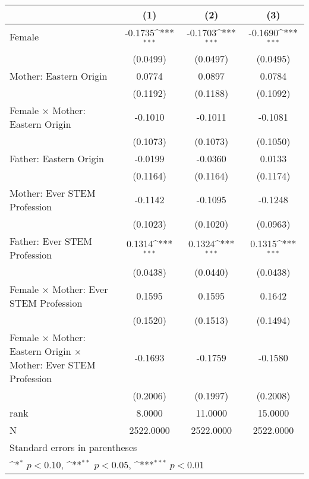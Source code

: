{
\def\sym#1{\ifmmode^{#1}\else\(^{#1}\)\fi}
\begin{tabular}{l*{3}{c}}
\toprule
                    &\multicolumn{1}{c}{(1)}         &\multicolumn{1}{c}{(2)}         &\multicolumn{1}{c}{(3)}         \\
\midrule
Female              &     -0.1735\sym{***}&     -0.1703\sym{***}&     -0.1690\sym{***}\\
                    &    (0.0499)         &    (0.0497)         &    (0.0495)         \\
\addlinespace
Mother: Eastern Origin&      0.0774         &      0.0897         &      0.0784         \\
                    &    (0.1192)         &    (0.1188)         &    (0.1092)         \\
\addlinespace
Female $\times$ Mother: Eastern Origin&     -0.1010         &     -0.1011         &     -0.1081         \\
                    &    (0.1073)         &    (0.1073)         &    (0.1050)         \\
\addlinespace
Father: Eastern Origin&     -0.0199         &     -0.0360         &      0.0133         \\
                    &    (0.1164)         &    (0.1164)         &    (0.1174)         \\
\addlinespace
Mother: Ever STEM Profession&     -0.1142         &     -0.1095         &     -0.1248         \\
                    &    (0.1023)         &    (0.1020)         &    (0.0963)         \\
\addlinespace
Father: Ever STEM Profession&      0.1314\sym{***}&      0.1324\sym{***}&      0.1315\sym{***}\\
                    &    (0.0438)         &    (0.0440)         &    (0.0438)         \\
\addlinespace
Female $\times$ Mother: Ever STEM Profession&      0.1595         &      0.1595         &      0.1642         \\
                    &    (0.1520)         &    (0.1513)         &    (0.1494)         \\
\addlinespace
Female $\times$ Mother: Eastern Origin $\times$ Mother: Ever STEM Profession&     -0.1693         &     -0.1759         &     -0.1580         \\
                    &    (0.2006)         &    (0.1997)         &    (0.2008)         \\
\midrule
rank                &      8.0000         &     11.0000         &     15.0000         \\
N                   &   2522.0000         &   2522.0000         &   2522.0000         \\
\bottomrule
\multicolumn{4}{l}{\footnotesize Standard errors in parentheses}\\
\multicolumn{4}{l}{\footnotesize \sym{*} \(p<0.10\), \sym{**} \(p<0.05\), \sym{***} \(p<0.01\)}\\
\end{tabular}
}
